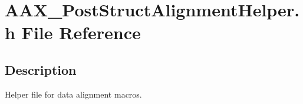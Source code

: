 \hypertarget{a00656}{}\section{A\+A\+X\+\_\+\+Post\+Struct\+Alignment\+Helper.\+h File Reference}
\label{a00656}


\subsection{Description}
Helper file for data alignment macros. 

